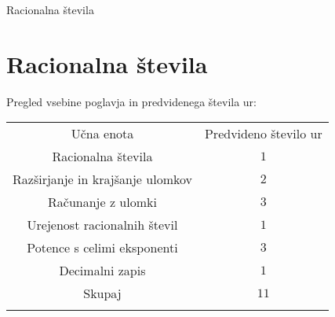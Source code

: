 \begin{priprava}{0}{}{}{Racionalna števila}{}{}
    
    \chapter{Racionalna števila}

    \Large{Pregled vsebine poglavja in predvidenega števila ur:}

    \begin{table}[H]
        \centering
        \begin{tabular}{||c|c||} 
        \hhline{|t:==:t|}
        \rowcolor[rgb]{0.843,0.718,0.718} 
        Učna enota  & Predvideno število ur   \\ 
        \hhline{|:==:|}
        Racionalna števila & $1$    \\ 
        \hline
        Razširjanje in krajšanje ulomkov & $2$    \\ 
        \hline
        Računanje z ulomki & $3$    \\ 
        \hline
        Urejenost racionalnih števil & $1$     \\
        \hline
        Potence s celimi eksponenti & $3$     \\
        \hline
        Decimalni zapis & $1$    \\ 
        \hhline{|:==:|}
        Skupaj & $11$     \\
        \hhline{|b:==:b|}
        \end{tabular}
    \end{table}


    
\end{priprava}